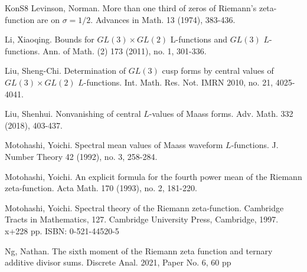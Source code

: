\documentclass[11pt,reqno]{amsart}
\theoremstyle{definition}
\theoremstyle{definition}
\theoremstyle{remark}
\numberwithin{equation}{section}
\begin{document}
\begin{thebibliography}{KonS8}
Levinson, Norman. More than one third of zeros of Riemann's zeta-function are on $\sigma=1/2$. Advances in Math. 13 (1974), 383-436. 

	

Li, Xiaoqing.  Bounds for $GL(3)\times GL(2)$ L-functions and $GL(3)$ $L$-functions. Ann. of Math. (2) 173 (2011), no. 1, 301-336.



 Liu, Sheng-Chi. Determination of $GL(3)$ cusp forms by central values of $GL(3)\times GL(2)$ $L$-functions. Int. Math. Res. Not. IMRN 2010, no. 21, 4025-4041. 




		
   Liu, Shenhui. Nonvanishing of central $L$-values of Maass forms. Adv. Math. 332 (2018), 403-437.		
   
   
 
	
	
	 Motohashi, Yoichi. Spectral mean values of Maass waveform $L$-functions. J. Number Theory 42 (1992), no. 3, 258-284. 
	
	
	Motohashi, Yoichi.  An explicit formula for the fourth power mean of the Riemann zeta-function. Acta Math. 170 (1993), no. 2, 181-220.
	
	
	Motohashi, Yoichi. Spectral theory of the Riemann zeta-function. Cambridge Tracts in Mathematics, 127. Cambridge University Press, Cambridge, 1997. x+228 pp. ISBN: 0-521-44520-5
	
	



	


 
 Ng, Nathan. The sixth moment of the Riemann zeta function and ternary additive divisor sums. Discrete Anal. 2021, Paper No. 6, 60 pp	
 

\end{thebibliography}
\end{document}
